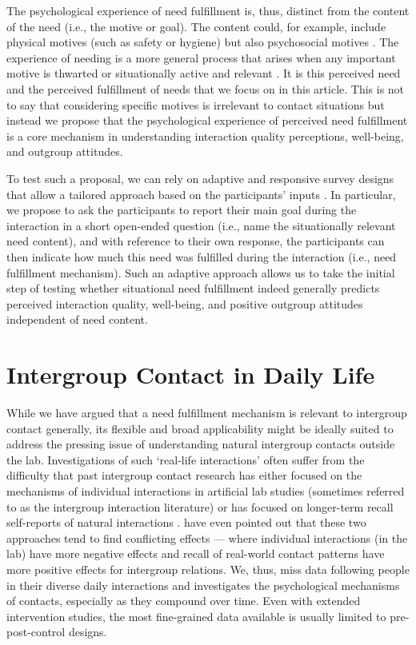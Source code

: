 \documentclass[man, 12pt, a4paper, mask]{apa7}
\theoremstyle{break}
\theoremstyle{plain}
\begin{document}
The psychological experience of need fulfillment is, thus, distinct from the content of the need (i.e., the motive or goal). The content could, for example, include physical motives (such as safety or hygiene) but also psychosocial motives \citep[such as acceptance or competence; e.g., see][]{pittman2007}. The experience of needing is a more general process that arises when any important motive is thwarted or situationally active and relevant \citep[][]{leander2020, lewin1926e, gollwitzer1985e}. It is this perceived need and the perceived fulfillment of needs that we focus on in this article. This is not to say that considering specific motives is irrelevant to contact situations but instead we propose that the psychological experience of perceived need fulfillment is a core mechanism in understanding interaction quality perceptions, well-being, and outgroup attitudes.

To test such a proposal, we can rely on adaptive and responsive survey designs that allow a tailored approach based on the participants' inputs \citep[e.g.,][]{Tourangeau2017}. In particular, we propose to ask the participants to report their main goal during the interaction in a short open-ended question (i.e., name the situationally relevant need content), and with reference to their own response, the participants can then indicate how much this need was fulfilled during the interaction (i.e., need fulfillment mechanism). Such an adaptive approach allows us to take the initial step of testing whether situational need fulfillment indeed generally predicts perceived interaction quality, well-being, and positive outgroup attitudes independent of need content. 

\section{Intergroup Contact in Daily Life}
While we have argued that a need fulfillment mechanism is relevant to intergroup contact generally, its flexible and broad applicability might be ideally suited to address the pressing issue of understanding natural intergroup contacts outside the lab. Investigations of such `real-life interactions' often suffer from the difficulty that past intergroup contact research has either focused on the mechanisms of individual interactions in artificial lab studies (sometimes referred to as the intergroup interaction literature) or has focused on longer-term recall self-reports of natural interactions \citep[commonly referred to as the intergroup contact literature; also see][]{Pettigrew2006}. \citet[][]{MacInnis2015} have even pointed out that these two approaches tend to find conflicting effects --- where individual interactions (in the lab) have more negative effects and recall of real-world contact patterns have more positive effects for intergroup relations. We, thus, miss data following people in their diverse daily interactions and investigates the psychological mechanisms of contacts, especially as they compound over time. Even with extended intervention studies, the most fine-grained data available is usually limited to pre-post-control designs. 
\end{document}
